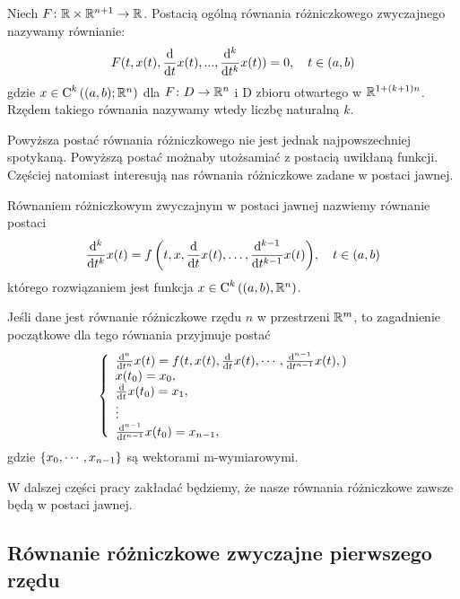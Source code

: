 \documentclass[12pt,a4paper]{report}
\begin{document}
\begin{definition}
Niech $F \colon \setR \times \setR^{n+1} \to \setR$. Postacią ogólną równania różniczkowego zwyczajnego nazywamy równianie: 
\begin{equation*}
F(t, x(t), \ddx{t} x(t),..., \ddx[^k]{t^k} x(t) ) = 0, \quad t \in (a,b)
\end{equation*}
gdzie $x \in \Ck{k}{(a,b); \setR^n}$ dla $F \colon D \to \setR^n$ i D zbioru otwartego w $\setR^{1+(k+1)n}$. 
Rzędem takiego równania nazywamy wtedy liczbę naturalną $k$. 
\end{definition}

Powyższa postać równania różniczkowego nie jest jednak najpowszechniej spotykaną. Powyższą postać możnaby utożsamiać z postacią uwikłaną funkcji. Częściej natomiast interesują nas równania różniczkowe zadane w postaci jawnej.

\begin{definition}
Równaniem różniczkowym zwyczajnym w postaci jawnej nazwiemy równanie postaci
$$
\ddx[{^k }]{t^k}x(t) = \function{f}{t,x,\ddx{t}x(t), \ldots, \ddx[{^{k-1}}]{t^{k-1}} x(t)}, \quad t\in (a,b)
$$
którego rozwiązaniem jest funkcja $x \in \Ck{k}{(a,b), \setR^n}$.
\end{definition}
\begin{definition}
Jeśli dane jest równanie różniczkowe rzędu $n$ w przestrzeni $\setR^m$, to zagadnienie początkowe dla tego równania przyjmuje postać 
\begin{equation} 
\left\{\begin{array}{ll}
\ddx[^n]{t^n} x(t) = f(t,x(t), \ddx{t}x(t), \cdots, \ddx[^{n-1}]{t^{n-1}}x(t),) &   \\
x(t_0) = x_0, & \\
\ddx{t}x(t_0) = x_1, & \\
\vdots & \\
\ddx[^{n-1}]{t^{n-1}}x(t_0) = x_{n-1}, &
\end{array} \right.
\end{equation}
gdzie $ \set{x_0,\cdots,x_{n-1}}$ są wektorami m-wymiarowymi. 
\end{definition}


W dalszej części pracy zakładać będziemy, że nasze równania różniczkowe zawsze będą w postaci jawnej.


\subsection{Równanie różniczkowe zwyczajne pierwszego rzędu}
\end{document}
